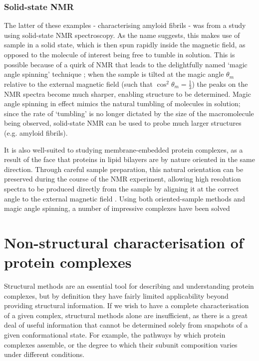 \documentclass[a4paper,11pt,twoside,openright]{scrbook}
\begin{document}
\subsubsection{Solid-state NMR}
The latter of these examples - characterising amyloid fibrils - was from a study using solid-state NMR spectroscopy. As the name suggests, this makes use of sample in a solid state, which is then spun rapidly inside the magnetic field, as opposed to the molecule of interest being free to tumble in solution. This is possible because of a quirk of NMR that leads to the delightfully named `magic angle spinning' technique \cite{Andrew1958,Lowe1959}; when the sample is tilted at the magic angle $\theta_{m}$ relative to the external magnetic field (such that $\cos^{2}\theta_{m} = \frac{1}{3}$) the peaks on the NMR spectra become much sharper, enabling structure to be determined. Magic angle spinning in effect mimics the natural tumbling of molecules in solution; since the rate of `tumbling' is no longer dictated by the size of the macromolecule being observed, solid-state NMR can be used to probe much larger structures (e.g. amyloid fibrils).

It is also well-suited to studying membrane-embedded protein complexes, as a result of the face that proteins in lipid bilayers are by nature oriented in the same direction. Through careful sample preparation, this natural orientation can be preserved during the course of the NMR experiment, allowing high resolution spectra to be produced directly from the sample by aligning it at the correct angle to the external magnetic field \cite{Hansen2015}. Using both oriented-sample methods and magic angle spinning, a number of impressive complexes have been solved \cite{Loquet2012,Kaplan2015,Huang2017}

\section{Non-structural characterisation of protein complexes}
Structural methods are an essential tool for describing and understanding protein complexes, but by definition they have fairly limited applicability beyond providing structural information. If we wish to have a complete characterisation of a given complex, structural methods alone are insufficient, as there is a great deal of useful information that cannot be determined solely from snapshots of a given conformational state. For example, the pathways by which protein complexes assemble, or the degree to which their subunit composition varies under different conditions.
\end{document}
